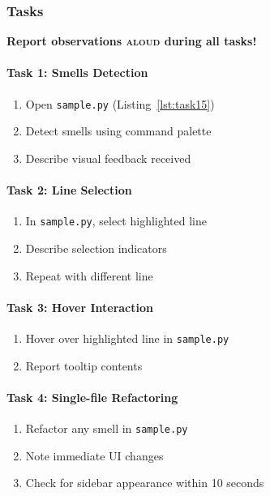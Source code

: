 \documentclass{article}
\begin{document}
\subsubsection{Tasks}
\textbf{Report observations \textsc{aloud} during all tasks!}

\paragraph{Task 1: Smells Detection}
\begin{enumerate}
    \item Open \texttt{sample.py} (Listing~\ref{lst:task15})
    \item Detect smells using command palette
    \item Describe visual feedback received
\end{enumerate}

\paragraph{Task 2: Line Selection}
\begin{enumerate}
    \item In \texttt{sample.py}, select highlighted line
    \item Describe selection indicators
    \item Repeat with different line
\end{enumerate}

\paragraph{Task 3: Hover Interaction}
\begin{enumerate}
    \item Hover over highlighted line in \texttt{sample.py}
    \item Report tooltip contents
\end{enumerate}

\paragraph{Task 4: Single-file Refactoring}
\begin{enumerate}
    \item Refactor any smell in \texttt{sample.py}
    \item Note immediate UI changes
    \item Check for sidebar appearance within 10 seconds
\end{enumerate}
\end{document}
